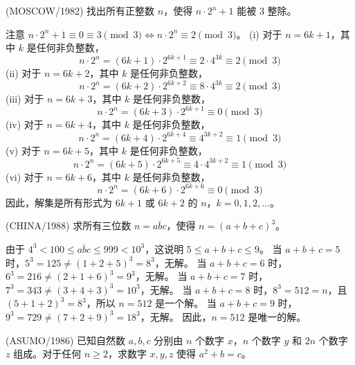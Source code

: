 \begin{questions}
\question (MOSCOW/1982) 找出所有正整数 $n$，使得 $n \cdot 2^n + 1$ 能被 3 整除。

\begin{solution}
注意 $n \cdot 2^n + 1 \equiv 0 \equiv 3 \pmod 3 \Leftrightarrow n \cdot 2^n \equiv 2 \pmod 3$。
(i) 对于 $n = 6k + 1$，其中 $k$ 是任何非负整数，
\[
n \cdot 2^n = (6k + 1) \cdot 2^{6k+1} \equiv 2 \cdot 4^{3k} \equiv 2 \pmod 3
\]
(ii) 对于 $n = 6k + 2$，其中 $k$ 是任何非负整数，
\[
n \cdot 2^n = (6k + 2) \cdot 2^{6k+2} \equiv 8 \cdot 4^{3k} \equiv 2 \pmod 3
\]
(iii) 对于 $n = 6k + 3$，其中 $k$ 是任何非负整数，
\[
n \cdot 2^n = (6k + 3) \cdot 2^{6k+1} \equiv 0 \pmod 3
\]
(iv) 对于 $n = 6k + 4$，其中 $k$ 是任何非负整数，
\[
n \cdot 2^n = (6k + 4) \cdot 2^{6k+4} \equiv 4^{3k+2} \equiv 1 \pmod 3
\]
(v) 对于 $n = 6k + 5$，其中 $k$ 是任何非负整数，
\[
n \cdot 2^n = (6k + 5) \cdot 2^{6k+5} \equiv 4 \cdot 4^{3k+2} \equiv 1 \pmod 3
\]
(vi) 对于 $n = 6k + 6$，其中 $k$ 是任何非负整数，
\[
n \cdot 2^n = (6k + 6) \cdot 2^{6k+6} \equiv 0 \pmod 3
\]
因此，解集是所有形式为 $6k+1$ 或 $6k+2$ 的 $n$，$k = 0, 1, 2, \dots$。
\end{solution}

\question (CHINA/1988) 求所有三位数 $n = \overline{abc}$，使得 $n = (a + b + c)^3$。

\begin{solution}
由于 $4^3 < 100 \le \overline{abc} \le 999 < 10^3$，这说明 $5 \le a + b + c \le 9$。
当 $a + b + c = 5$ 时，$5^3 = 125 \neq (1 + 2 + 5)^3 = 8^3$，无解。
当 $a + b + c = 6$ 时，$6^3 = 216 \neq (2 + 1 + 6)^3 = 9^3$，无解。
当 $a + b + c = 7$ 时，$7^3 = 343 \neq (3 + 4 + 3)^3 = 10^3$，无解。
当 $a + b + c = 8$ 时，$8^3 = 512 = n$，且 $(5 + 1 + 2)^3 = 8^3$，所以 $n = 512$ 是一个解。
当 $a + b + c = 9$ 时，$9^3 = 729 \neq (7 + 2 + 9)^3 = 18^3$，无解。
因此，$n = 512$ 是唯一的解。
\end{solution}

\question (ASUMO/1986) 已知自然数 $a, b, c$ 分别由 $n$ 个数字 $x$，$n$ 个数字 $y$ 和 $2n$ 个数字 $z$ 组成。对于任何 $n \ge 2$，求数字 $x, y, z$ 使得 $a^2 + b = c$。


\end{questions}
